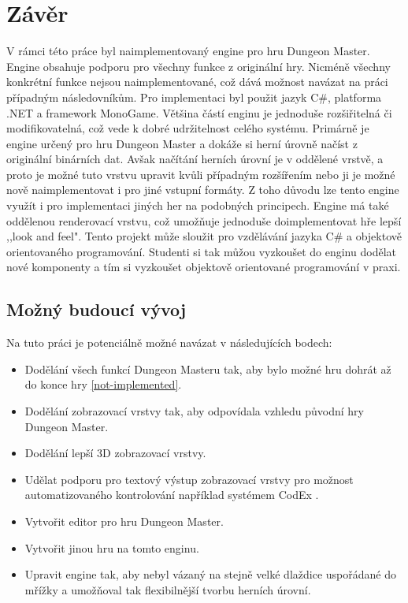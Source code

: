 \chapter*{Závěr}

V rámci této práce byl naimplementovaný engine pro hru Dungeon Master. Engine 
obsahuje podporu pro všechny funkce z originální hry. Nicméně všechny konkrétní funkce
nejsou naimplementované, což dává možnost navázat na práci případným následovníkům. 
Pro implementaci byl použit jazyk C\#, platforma .NET a framework MonoGame. 
Většina částí enginu je jednoduše rozšiřitelná či modifikovatelná, což vede 
k dobré udržitelnost celého systému. Primárně je engine určený pro hru 
Dungeon Master a dokáže si herní úrovně načíst z originální binárních dat. Avšak 
načítání herních úrovní je v oddělené vrstvě, a proto je možné tuto vrstvu upravit kvůli případným 
rozšířením nebo ji je možné nově naimplementovat i pro jiné vstupní formáty.
Z toho důvodu lze tento engine využít i pro implementaci jiných her na podobných principech.
Engine má také oddělenou renderovací vrstvu, což umožňuje jednoduše doimplementovat hře lepší ,,look and feel".
Tento projekt může sloužit pro vzdělávání jazyka C\# a objektově orientovaného programování. 
Studenti si tak můžou vyzkoušet do enginu dodělat nové komponenty a tím si vyzkoušet objektově 
orientované programování v praxi.

\section*{Možný budoucí vývoj}
Na tuto práci je potenciálně možné navázat v následujících bodech:

\begin{itemize}
\item Dodělání všech funkcí Dungeon Masteru tak, aby bylo možné hru dohrát až do konce hry \vref{not-implemented}.
\item Dodělání zobrazovací vrstvy tak, aby odpovídala vzhledu původní hry Dungeon Master.
\item Dodělání lepší 3D zobrazovací vrstvy.
\item Udělat podporu pro textový výstup zobrazovací vrstvy pro možnost automatizovaného kontrolování například systémem CodEx \cite{CodEx}. 
\item Vytvořit editor pro hru Dungeon Master. 
\item Vytvořit jinou hru na tomto enginu.
\item Upravit engine tak, aby nebyl vázaný na stejně velké dlaždice uspořádané do mřížky a umožňoval tak
	flexibilnější tvorbu herních úrovní. 
\end{itemize}




